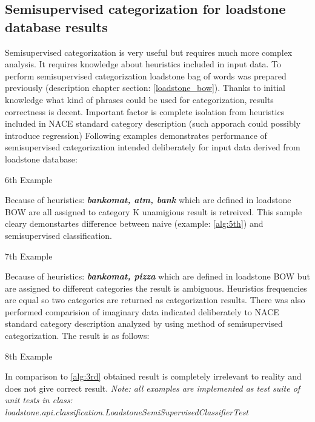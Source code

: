 \subsection{Semisupervised categorization for loadstone database results}
Semisupervised categorization is very useful but requires much more complex analysis. It requires knowledge about heuristics included in input data. To perform semisupervised categorization loadstone bag of words was prepared previously (description chapter section: \ref{loadstone_bow}). Thanks to initial knowledge what kind of phrases could be used for categorization, results correctness is decent. Important factor is complete isolation from heuristics included in NACE standard category description (such apporach could possibly introduce regression) Following examples demonstrates performance of semisupervised categorization intended deliberately for input data derived from loadstone database:
\newline
\begin{algorithm}
	\caption{6th Example}\label{alg:6th}
\end{algorithm}
Because of heuristics: \textbf{\textit{bankomat, atm, bank}} which are defined in loadstone BOW are all assigned to category K unamigious result is retreived. This sample cleary demonstartes difference between naive (example: \ref{alg:5th}) and semisupervised classification.
\newline
\begin{algorithm}
	\caption{7th Example}\label{alg:7th}
\end{algorithm}
Because of heuristics: \textbf{\textit{bankomat, pizza}} which are defined in loadstone BOW but are assigned to different categories the result is ambiguous. Heuristics frequencies are equal so two categories are returned as categorization results.
\newline
There was also performed comparision of imaginary data indicated deliberately to NACE standard category description analyzed by using method of semisupervised categorization. The result is as follows:
\begin{algorithm}
	\caption{8th Example}\label{alg:8th}
\end{algorithm}
In comparison to \ref{alg:3rd} obtained result is completely irrelevant to reality and does not give correct result.
\newline 
\textit{Note: all examples are implemented as test suite of unit tests in class: loadstone.api.classification.LoadstoneSemiSupervisedClassifierTest}

